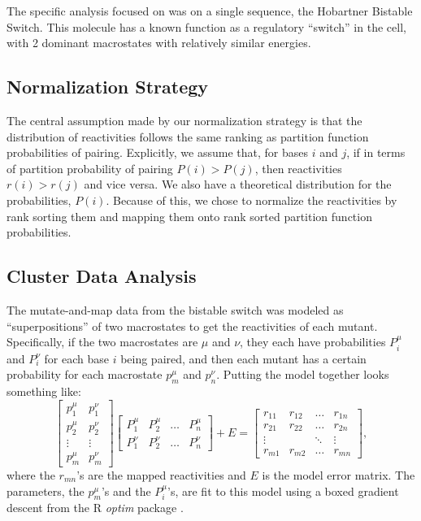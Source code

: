 The specific analysis focused on was on a single sequence, the
Hobartner Bistable Switch. This molecule has a known function as a
regulatory ``switch'' in the cell, with 2 dominant macrostates with
relatively similar energies.

\subsection{Normalization Strategy}

The central assumption made by our normalization strategy is that the
distribution of reactivities follows the same ranking as partition
function probabilities of pairing. Explicitly, we assume that, for
bases $i$ and $j$, if in terms of partition probability of pairing
$P(i)>P(j)$, then reactivities $r(i) > r(j)$ and vice versa. We also
have a theoretical distribution for the probabilities, $P(i)$. Because
of this, we chose to normalize the reactivities by rank sorting them
and mapping them onto rank sorted partition function probabilities.

\subsection{Cluster Data Analysis}

The mutate-and-map data from the bistable switch was modeled as
``superpositions'' of two macrostates to get the reactivities of each
mutant. Specifically, if the two macrostates are $\mu$ and $\nu$,
they each have probabilities $P^\mu_i$ and $P^\nu_i$ for each base $i$
being paired, and then each mutant has a certain probability for each
macrostate $p^\mu_m$ and $p^\nu_n$. Putting the model together looks
something like:
\begin{equation}
\begin{bmatrix}
p^\mu_1 & p^\nu_1 \\
p^\mu_2 & p^\nu_2 \\
\vdots & \vdots \\
p^\mu_m & p^\nu_m
\end{bmatrix}
\begin{bmatrix}
P^\mu_1 & P^\mu_2 & \dots & P^\mu_n \\
P^\nu_1 & P^\nu_2 & \dots & P^\nu_n
\end{bmatrix} + E = 
\begin{bmatrix}
r_{11} & r_{12} & \dots & r_{1n} \\
r_{21} & r_{22} & \dots & r_{2n} \\
\vdots & &\ddots & \vdots \\
r_{m1} & r_{m2} & \dots & r_{mn}
\end{bmatrix},
\end{equation}
where the $r_{mn}$'s are the mapped reactivities and $E$ is the model
error matrix. The parameters, the $p^\mu_m$'s and the $P^\mu_i$'s, are
fit to this model using a boxed gradient descent from the R
\emph{optim} package \cite{byrd1995limited}.


